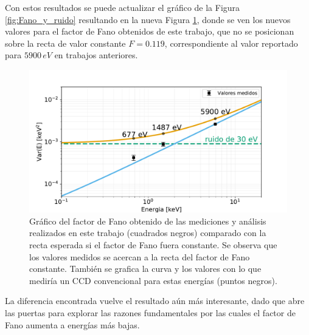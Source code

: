Con estos resultados se puede actualizar el gráfico de la Figura \ref{fig:Fano_y_ruido} resultando en la nueva Figura \ref{fig:Fano_y_ruido_final}, donde se ven los nuevos valores para el factor de Fano obtenidos de este trabajo, que no se posicionan sobre la recta de valor constante $F = 0.119$, correspondiente al valor reportado para $5900\,\si{eV}$ en trabajos anteriores\cite{Rodrigues}.
\begin{figure}[H]
    \centering
        \includegraphics[scale=0.5]{Figs/FanoyRuidoFinal.pdf}
    \caption{Gráfico del factor de Fano obtenido de las mediciones y análisis realizados en este trabajo (cuadrados negros) comparado con la recta esperada si el factor de Fano fuera constante. Se observa que los valores medidos se acercan a la recta del factor de Fano constante. También se grafica la curva y los valores con lo que mediría un CCD convencional para estas energías (puntos negros).}
    \label{fig:Fano_y_ruido_final}
\end{figure}

La diferencia encontrada vuelve el resultado aún más interesante, dado que abre las puertas para explorar las razones fundamentales por las cuales el factor de Fano aumenta a energías más bajas.